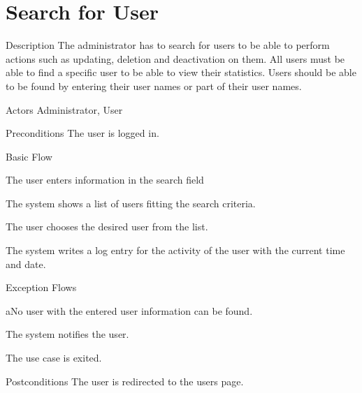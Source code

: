 \section{Search for User}

%
\begin{cpart}{Description}
The administrator has to search for users to be able to perform actions such as updating, deletion and deactivation on them. All users must be able to find a specific user to be able to view their statistics. Users should be able to be found by entering their user names or part of their user names.
\end{cpart}


%
\begin{cpart}{Actors}
Administrator, User
\end{cpart}

%
\begin{cpart}{Preconditions}
The user is logged in.
\end{cpart}

%
\begin{cpartList}{Basic Flow}
  \item The user enters information in the search field
  \item The system shows a list of users fitting the search criteria.
  \item The user chooses the desired user from the list.
  \item The system writes a log entry for the activity of the user with the current time and date.
\end{cpartList}

%
\begin{cpartList}{Exception Flows}
  \begin{innerList}{4}{a}{No user with the entered user information can be found.}
    \item The system notifies the user.
    \item The use case is exited.
  \end{innerList}
\end{cpartList}

%
\begin{cpart}{Postconditions}
The user is redirected to the users page.
\end{cpart}

